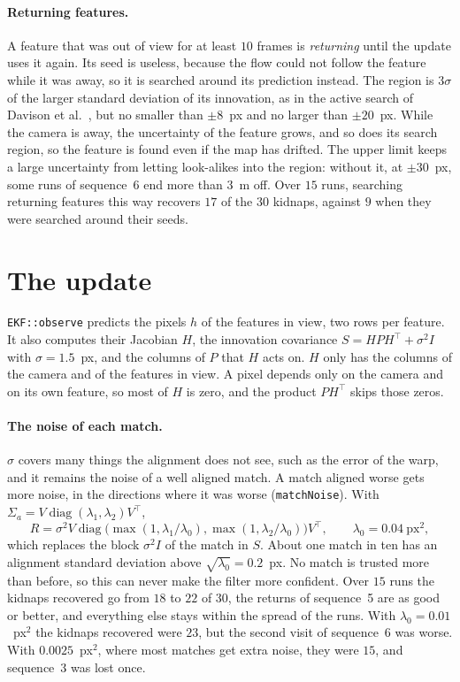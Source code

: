 \documentclass[11pt]{article}
\begin{document}
\paragraph{Returning features.}
A feature that was out of view for at least $10$ frames is \emph{returning} until the update uses
it again. Its seed is useless, because the flow could not follow the feature while it was away, so
it is searched around its prediction instead. The region is $3\sigma$ of the larger standard
deviation of its innovation, as in the active search of Davison et al.~\cite{davison2007}, but no
smaller than $\pm 8$~px and no larger than $\pm 20$~px. While the camera is away, the uncertainty of
the feature grows, and so does its search region, so the feature is found even if the map has
drifted. The upper limit keeps a large uncertainty from letting look-alikes into the region: without it, at
$\pm 30$~px, some runs of sequence~6 end more than $3$~m off. Over $15$ runs, searching returning
features this way recovers $17$ of the $30$ kidnaps, against $9$ when they were searched around
their seeds.

\section{The update}
\label{sec:update}

\texttt{EKF::observe} predicts the pixels $h$ of the features in view, two rows per feature. It
also computes their Jacobian $H$, the innovation covariance $S = H P H^\top + \sigma^2 I$ with
$\sigma = 1.5$~px, and the columns of $P$ that $H$ acts on. $H$ only has the columns of the camera
and of the features in view. A pixel depends only on the camera and on its own feature, so most of
$H$ is zero, and the product $P H^\top$ skips those zeros.

\paragraph{The noise of each match.}
$\sigma$ covers many things the alignment does not see, such as the error of the warp, and it
remains the noise of a well aligned match. A match aligned worse gets more noise, in the directions
where it was worse (\texttt{matchNoise}). With $\Sigma_a = V \operatorname{diag}(\lambda_1,
\lambda_2) V^\top$,
\begin{equation}
  R = \sigma^2 V \operatorname{diag}\big(\max(1, \lambda_1 / \lambda_0), \max(1, \lambda_2 / \lambda_0)\big) V^\top,
  \qquad \lambda_0 = 0.04~\text{px}^2,
\end{equation}
which replaces the block $\sigma^2 I$ of the match in $S$. About one match in ten has an alignment
standard deviation above $\sqrt{\lambda_0} = 0.2$~px. No match is trusted more than before, so this
can never make the filter more confident. Over $15$ runs the kidnaps recovered go from $18$ to $22$
of $30$, the returns of sequence~5 are as good or better, and everything else stays within the
spread of the runs. With $\lambda_0 = 0.01$~px$^2$ the kidnaps recovered were $23$, but the second
visit of sequence~6 was worse. With $0.0025$~px$^2$, where most matches get extra noise, they were
$15$, and sequence~3 was lost once.
\end{document}
